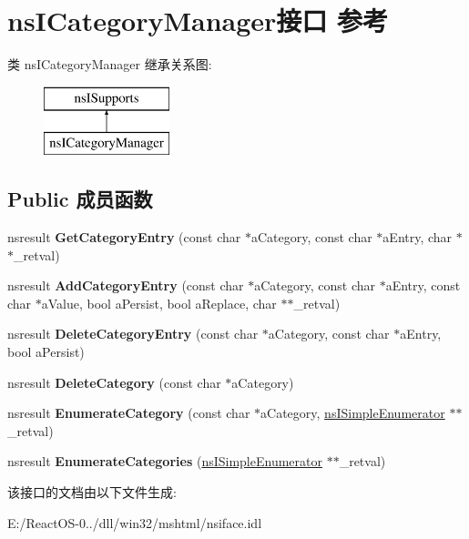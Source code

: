 \hypertarget{interfacens_i_category_manager}{}\section{ns\+I\+Category\+Manager接口 参考}
\label{interfacens_i_category_manager}
类 ns\+I\+Category\+Manager 继承关系图\+:\begin{figure}[H]
\begin{center}
\leavevmode
\includegraphics[height=2.000000cm]{interfacens_i_category_manager}
\end{center}
\end{figure}
\subsection*{Public 成员函数}
\begin{DoxyCompactItemize}
\item 
\mbox{\label{interfacens_i_category_manager_ab8c37a6aecd345de7a72484214ce3a5f}} 
nsresult {\bfseries Get\+Category\+Entry} (const char $\ast$a\+Category, const char $\ast$a\+Entry, char $\ast$$\ast$\+\_\+retval)
\item 
\mbox{\label{interfacens_i_category_manager_a36f1ff4374ec2d94ad8bd3f1b6b004b2}} 
nsresult {\bfseries Add\+Category\+Entry} (const char $\ast$a\+Category, const char $\ast$a\+Entry, const char $\ast$a\+Value, bool a\+Persist, bool a\+Replace, char $\ast$$\ast$\+\_\+retval)
\item 
\mbox{\label{interfacens_i_category_manager_ab08b25afcf344a8857ef12d0437af54a}} 
nsresult {\bfseries Delete\+Category\+Entry} (const char $\ast$a\+Category, const char $\ast$a\+Entry, bool a\+Persist)
\item 
\mbox{\label{interfacens_i_category_manager_a30d7840e817f0238717062264807241c}} 
nsresult {\bfseries Delete\+Category} (const char $\ast$a\+Category)
\item 
\mbox{\label{interfacens_i_category_manager_a612095b5e282016181cbcbdd9a3eb057}} 
nsresult {\bfseries Enumerate\+Category} (const char $\ast$a\+Category, \hyperlink{interfacens_i_simple_enumerator}{ns\+I\+Simple\+Enumerator} $\ast$$\ast$\+\_\+retval)
\item 
\mbox{\label{interfacens_i_category_manager_af647e8dd8861127b8e03df0f173a9a9d}} 
nsresult {\bfseries Enumerate\+Categories} (\hyperlink{interfacens_i_simple_enumerator}{ns\+I\+Simple\+Enumerator} $\ast$$\ast$\+\_\+retval)
\end{DoxyCompactItemize}


该接口的文档由以下文件生成\+:\begin{DoxyCompactItemize}
\item 
E\+:/\+React\+O\+S-\/0../dll/win32/mshtml/nsiface.\+idl\end{DoxyCompactItemize}
